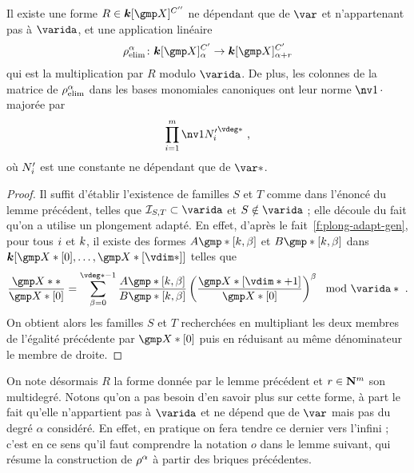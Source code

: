 \begin{coro} \label{c:hmat-relim}
  Il existe une forme \( R \in \cdn [\vmp]^{C''} \) ne dépendant que de \(
    \var \) et n'appartenant pas à \( \varida \), et
  une application linéaire
  \begin{equation}
    \relim^\alpha \colon
    \cdn [\vmp]_ {\alpha}^{C'}
    \to
    \cdn [\vmp]_ {\alpha+r}^{C'}
  \end{equation}
  qui est la multiplication par \( R \) modulo \( \varida \).  De plus, les
  colonnes de la matrice de \( \rho\sb{\mathrm{elim}}^\alpha \) dans les bases monomiales
  canoniques ont leur norme \( \nv1\truc \) majorée par
  \begin{equation}
    \prod\fctrange
    \nv1{ N'_\fct }^{\vdeg*}
    \pmm,
  \end{equation}
  où \( N'_i \) est une constante ne dépendant que de \( \var* \).
\end{coro}

\begin{proof}
  Il suffit d'établir l'existence de familles \( S \) et \( T \) comme dans
  l'énoncé du lemme précédent, telles que \( \Ideal_{S, T} \subset \varida \)
  et \( S \notin \varida \) ;
  elle découle du fait qu'on a utilise un plongement adapté.
  En effet, d'après le fait~\ref{f:plong-adapt-gen}, pour tous \( i \) et
  \( k \), il existe des formes \( A\mexp*[\ind, \beta] \) et \(
    B\mexp*[\ind, \beta] \) dans
  \( \cdn [ \vmp*[0], \dots, \vmp*[\vdim*] ] \) telles que
  \begin{equation}
    \frac{ \vmp** }{ \vmp*[0] }
    =
    \sum_{\beta = 0}^{\vdeg* - 1}
    \frac {A\mexp*[\ind, \beta]} {B\mexp*[\ind, \beta]}
    \left( \frac{ \vmp*[\vdim* + 1] }{ \vmp*[0] } \right) ^\beta
    \mod \varida*
    \pmm.
  \end{equation}
  On obtient alors les familles \( S \) et \( T \) recherchées en multipliant
  les deux membres de l'égalité précédente par \( \vmp*[0] \) puis en
  réduisant au même dénominateur le membre de droite.
\end{proof}

On note désormais \( R \) la forme donnée par le lemme précédent et \( r \in
  {\mathbf{N}}^m \) son multidegré. Notons qu'on a pas besoin d'en savoir plus sur
cette forme, à part le fait qu'elle n'appartient pas à \( \varida \) et ne
dépend que de \( \var \) mais pas du degré \( \alpha \) considéré. En effet,
en pratique on fera tendre ce dernier vers l'infini ; c'est en ce sens qu'il
faut comprendre la notation \( o \) dans le lemme suivant, qui résume la
construction de \( \rho^\alpha \) à partir des briques précédentes.

